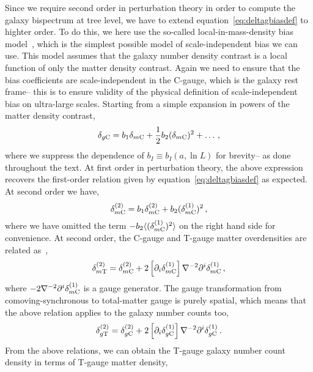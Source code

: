 Since we require second order in perturbation theory in order to compute the galaxy bispectrum at tree level, we have to extend equation~\eqref{eq:deltagbiasdef} to highter order. To do this, we here use the so-called local-in-mass-density bias model~\cite{Desjacques:2016bnm}, which is the simplest possible model of scale-independent bias we can use. This model assumes that the galaxy number density contrast is a local function of only the matter density contrast. Again we need to ensure that the bias coefficients are scale-independent in the C-gauge, which is the galaxy rest frame-- this is to ensure validity of the physical definition of scale-independent bias on ultra-large scales. Starting from a simple expansion in powers of the matter density contrast,
\begin{equation}
	\delta_{g\mathrm{C}} = b_1 \delta_{m\mathrm{C}} + \frac{1}{2} b_2 (\delta_{m\mathrm{C}})^2 + \ldots\,,
\end{equation}
where we suppress the dependence of $b_I \equiv b_I(a,\ln L)$ for brevity-- as done throughout the text. At first order in perturbation theory, the above expression recovers the first-order relation given by equation~\eqref{eq:deltagbiasdef} as expected. At second order we have, 
\begin{equation}\label{eq:biasCgauge}
	\delta^{(2)}_{m\mathrm{C}} = b_1 \delta^{(2)}_{m\mathrm{C}} + b_2 (\delta^{(1)}_{m\mathrm{C}})^2\,,
\end{equation}
where we have omitted the term $- b_2 \langle (\delta^{(1)}_{m\mathrm{C}})^2 \rangle$ on the right hand side for convenience.
At second order, the C-gauge and T-gauge matter overdensities are related as~\cite{Bertacca:2015mca,Villa:2015ppa}, 
\begin{equation}
	\delta_{m\mathrm{T}}^{(2)} = \delta_{m\mathrm{C}}^{(2)} + 2 \left[ \partial_i \delta_{m\mathrm{C}}^{(1)} \right] \nabla^{-2} \partial^i \delta_{m\mathrm{C}}^{(1)}\,,
\end{equation}
where $-2\nabla^{-2} \partial^i \delta_{m\mathrm{C}}^{(1)}$ is a gauge generator. The gauge transformation from comoving-synchronous to total-matter gauge is purely spatial, which means that the above relation applies to the galaxy number counts too, 
\begin{equation}
	\delta_{g\mathrm{T}}^{(2)} = \delta_{g\mathrm{C}}^{(2)} + 2 \left[ \partial_i \delta_{g\mathrm{C}}^{(1)} \right] \nabla^{-2} \partial^i \delta_{g\mathrm{C}}^{(1)}\,.
\end{equation}
From the above relations, we can obtain the T-gauge galaxy number count density in terms of T-gauge matter density, 
